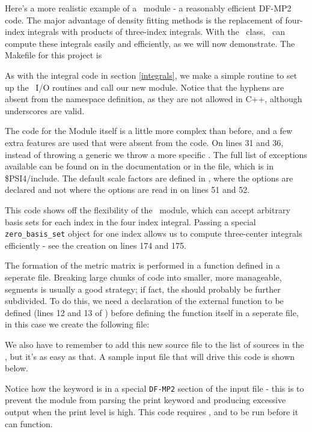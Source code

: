 Here's a more realistic example of a \PSIfour\ module - a reasonably efficient
DF-MP2 code.  The major advantage of density fitting methods is the replacement
of four-index integrals with products of three-index integrals.  With the
\libmints\ class, \PSIfour\ can compute these integrals easily and efficiently,
as we will now demonstrate.  The Makefile for this project is


As with the integral code in section \ref{integrals}, we make a simple
 routine to set up the \PSI\ I/O routines and call our new module.
Notice that the hyphens are absent from the namespace definition, as they are
not allowed in C++, although underscores are valid.


The code for the Module itself is a little more complex than before, and a few
extra features are used that were absent from the  code.  On
lines 31 and 36, instead of throwing a generic  we throw a
more specific .  The full list of exceptions available
can be found on in the  documentation or in the
 file, which is in \$PSI4/include.  The default scale
factors are defined in , where the options are declared and not
where the options are read in on lines 51 and 52.

This code shows off the flexibility of the \libmints\ module, which can accept
arbitrary basis sets for each index in the four index integral.  Passing a
special {\tt zero\_basis\_set} object for one index allows us to compute
three-center integrals efficiently - see the  creation
on lines 174 and 175.  


The formation of the metric matrix is performed in a function defined in a
seperate file.  Breaking large chunks of code into smaller, more manageable,
segments is usually a good strategy; if fact, the  should
probably be further subdivided.  To do this, we need a declaration of the
external function to be defined (lines 12 and 13 of ) before
defining the function itself in a seperate file, in this case we create the
following file:


We also have to remember to add this new source file to the list of sources in
the , but it's as easy as that.  A sample input file that will
drive this code is shown below.


Notice how the  keyword is in a special {\tt DF-MP2} section of
the input file - this is to prevent the  module from parsing the
print keyword and producing excessive output when the print level is high.
This code requires ,  and  to be run
before it can function.
